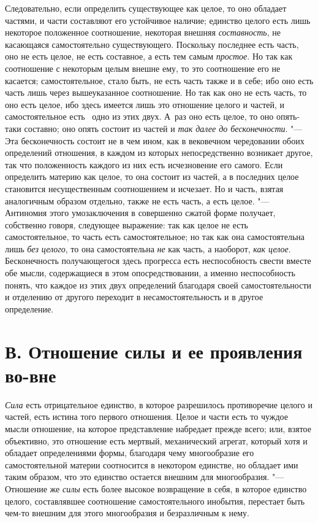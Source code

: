 Следовательно, если определить существующее как целое, то оно обладает
частями, и части составляют его устойчивое наличие; единство целого есть
лишь некоторое положенное соотношение, некоторая внешняя
{\em составность}, не касающаяся самостоятельно
существующего. Поскольку последнее есть часть, оно не есть целое, не есть
составное, а есть тем самым {\em простое}. Но так как
соотношение с некоторым целым внешне ему, то это соотношение его не
касается; самостоятельное, стало быть, не есть часть также и в себе; ибо
оно есть часть лишь через вышеуказанное соотношение. Но так как оно не есть
часть, то оно есть целое, ибо здесь имеется лишь это отношение целого и
частей, и самостоятельное есть \ одно из этих двух. А~раз оно есть целое,
то оно опять-таки составно; оно опять состоит из частей и
{\em так далее до бесконечности}. "--- Эта бесконечность
состоит не в чем ином, как в вековечном чередовании обоих определений
отношения, в каждом из которых непосредственно возникает другое, так что
положенность каждого из них есть исчезновение его самого. Если определить
материю как целое, то она состоит из частей, а в последних целое становится
несущественным соотношением и исчезает. Но и часть, взятая аналогичным
образом отдельно, также не есть часть, а есть целое. "--- Антиномия этого
умозаключения в совершенно сжатой форме получает, собственно говоря,
следующее выражение: так как целое не есть самостоятельное, то часть есть
самостоятельное; но так как она самостоятельна лишь
{\em без целого}, то она самостоятельна
{\em не} как часть, а наоборот,
{\em как целое}. Бесконечность получающегося здесь
прогресса есть неспособность свести вместе обе мысли, содержащиеся в этом
опосредствовании, а именно неспособность понять, что каждое из этих двух
определений благодаря своей самостоятельности и отделению от другого
переходит в несамостоятельность и в другое определение.


\section[В. Отношение силы и ее проявления во-вне]
{В. Отношение силы и ее проявления во-вне}

{\em Сила} есть
отрицательное единство, в которое разрешилось противоречие целого и частей,
есть истина того первого отношения. Целое и части есть то чуждое мысли
отношение, на которое представление набредает прежде всего; или, взятое
объективно, это отношение есть мертвый, механический агрегат, который хотя
и обладает определениями формы, благодаря чему многообразие его
самостоятельной материи соотносится в некотором единстве, но обладает ими
таким образом, что это единство остается внешним для многообразия. "---
Отношение же {\em силы} есть более высокое возвращение
в себя, в которое единство целого, составлявшее соотношение
самостоятельного инобытия, перестает быть чем-то внешним для этого
многообразия и безразличным к нему.

